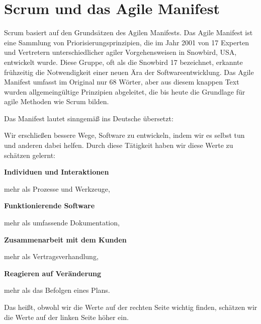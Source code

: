 \section{Scrum und das Agile Manifest}
Scrum basiert auf den Grundsätzen des Agilen Manifests. Das Agile Manifest ist eine Sammlung von Priorisierungsprinzipien, die im Jahr 2001 von 17 Experten und Vertretern unterschiedlicher agiler Vorgehensweisen in Snowbird, USA, entwickelt wurde. Diese Gruppe, oft als die \glqq Snowbird 17\grqq{} bezeichnet, erkannte frühzeitig die Notwendigkeit einer neuen Ära der Softwareentwicklung. \cite{Drumond} Das Agile Manifest umfasst im Original nur 68 Wörter, aber aus diesem knappen Text wurden allgemeingültige Prinzipien abgeleitet, die bis heute die Grundlage für agile Methoden wie Scrum bilden.

Das Manifest lautet sinngemäß ins Deutsche übersetzt: 

\vspace{1em}
\glqq Wir erschließen bessere Wege, Software zu entwickeln, indem wir es selbst tun und anderen dabei helfen. Durch diese Tätigkeit haben wir diese Werte zu schätzen gelernt:

\noindent \textbf{Individuen und Interaktionen}
\vspace{-1em}
\begin{flushright}
mehr als Prozesse und Werkzeuge,
\end{flushright}
\vspace{-1em}
\textbf{Funktionierende Software}
\vspace{-1em}
\begin{flushright}
mehr als umfassende Dokumentation,
\end{flushright}
\vspace{-1em}
\textbf{Zusammenarbeit mit dem Kunden}
\vspace{-1em}
\begin{flushright}
mehr als Vertragsverhandlung,
\end{flushright}
\vspace{-1em}
\textbf{Reagieren auf Veränderung}
\vspace{-1em}
\begin{flushright}
mehr als das Befolgen eines Plans.
\end{flushright}

Das heißt, obwohl wir die Werte auf der rechten Seite wichtig finden, schätzen wir die Werte auf der linken Seite höher ein.\grqq{} \cite{Snowbird2001}


